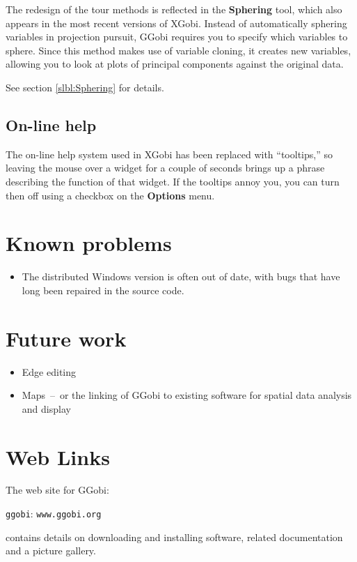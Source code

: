 \documentclass[11pt]{article}
\begin{document}
The redesign of the tour methods is reflected in the {\bf Sphering}
tool, which also appears in the most recent versions of XGobi.
Instead of automatically sphering variables in projection pursuit,
GGobi requires you to specify which variables to sphere.  Since this
method makes use of variable cloning, it creates new variables,
allowing you to look at plots of principal components against the
original data.

See section \ref{slbl:Sphering} for details.

\subsection{On-line help}

The on-line help system used in XGobi has been replaced with
``tooltips,'' so leaving the mouse over a widget for a couple of
seconds brings up a phrase describing the function of that widget.
If the tooltips annoy you, you can turn then off using a checkbox on
the {\bf Options} menu.

\section{Known problems}

\begin{itemize}
\item The distributed Windows version is often out of date,
   with bugs that have long been repaired in the source code.
\end{itemize}

\section{Future work}

\begin{itemize}
\item Edge editing
\item Maps~--~or the linking of GGobi to existing software for
  spatial data analysis and display
\end{itemize}

\section*{Web Links}

The web site for GGobi:

\centerline{{\tt ggobi}: {\tt www.ggobi.org}}

contains details on downloading and installing software, related
documentation and a picture gallery.

\newpage

\end{document}
